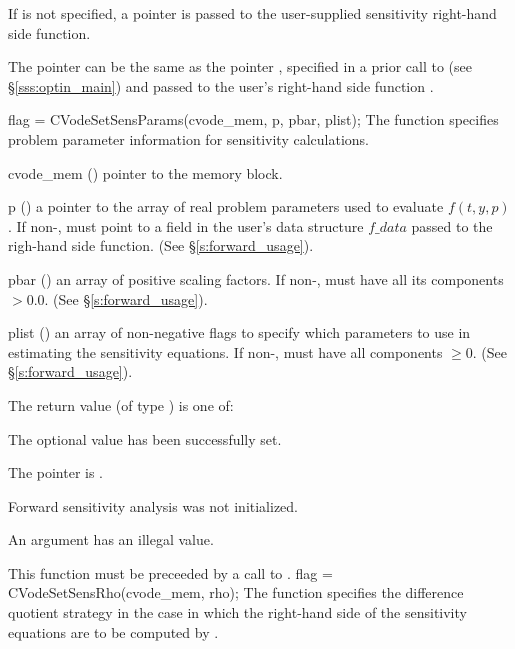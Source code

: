 {
  If  is not specified, a  pointer is
  passed to the user-supplied sensitivity right-hand side function.

  The pointer  can be the same as the pointer ,
  specified in a prior call to  (see \S\ref{sss:optin_main})
  and passed to the user's right-hand side function .
}
{
  flag = CVodeSetSensParams(cvode\_mem, p, pbar, plist);
}
{
  The function  specifies problem parameter information
  for sensitivity calculations.
}
{
  \begin{args}
  \item[cvode\_mem] ()
    pointer to the {\cvodes} memory block.
  \item[p] ()
    a pointer to the array of real problem parameters used to evaluate $f(t,y,p)$.
    If non-,  must point to a field in the user's data structure
    $f\_data$ passed to the righ-hand side function.
    (See \S\ref{s:forward_usage}).
  \item[pbar] ()
    an array of  positive scaling factors. If non-,  must
    have all its components $> 0.0$.
    (See \S\ref{s:forward_usage}).
  \item[plist] () 
    an array of  non-negative flags to specify which parameters to use in
    estimating the sensitivity equations. If non-,  must
    have all components $\ge 0$.
    (See \S\ref{s:forward_usage}).
  \end{args}
}
{
  The return value  (of type ) is one of:
  \begin{args}
  \item[\Id{CV\_SUCCESS}] 
    The optional value has been successfully set.
  \item[\Id{CV\_MEM\_NULL}]
    The  pointer is .
  \item[\Id{CV\_NO\_SENS}]
    Forward sensitivity analysis was not initialized.
  \item[\Id{CV\_ILL\_INPUT}]
    An argument has an illegal value.
  \end{args}
}
{
  {\warn}This function must be preceeded by a call to .
}
{
  flag = CVodeSetSensRho(cvode\_mem, rho);
}
{
  The function  specifies the difference quotient strategy in
  the case in which the right-hand side of the sensitivity equations are to
  be computed by {\cvodes}.
}
